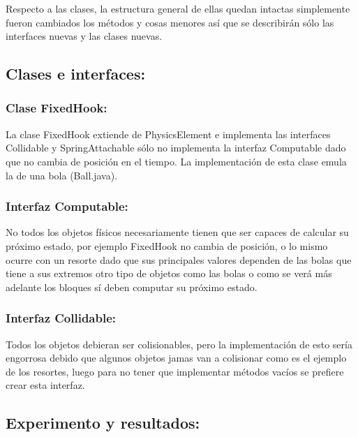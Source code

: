 \documentclass[a4paper,10pt]{article}
\begin{document}
 
 Respecto a las clases, la estructura general de ellas quedan intactas simplemente fueron cambiados los métodos y cosas menores así que se 
 describirán sólo las interfaces nuevas y las clases nuevas.\newline
 
 
\subsection{Clases e interfaces:}
\subsubsection{Clase FixedHook:}


 La clase FixedHook extiende de PhysicsElement e implementa las interfaces Collidable y SpringAttachable sólo no implementa la interfaz Computable
 dado que no cambia de posición en el tiempo. La implementación de esta clase emula la de una bola (Ball.java).\newline
 
 \subsubsection{Interfaz Computable:}
 
 
  No todos los objetos físicos necesariamente tienen que ser capaces de calcular su próximo estado, por ejemplo FixedHook no cambia de posición,
  o lo mismo ocurre con un resorte dado que sus principales valores dependen de las bolas que tiene a sus extremos otro tipo de objetos 
  como las bolas o como se verá más adelante los bloques sí deben computar su próximo estado.\newline
 
 
 \subsubsection{Interfaz Collidable:}
  
  
  Todos los objetos debieran ser colisionables, pero la implementación de esto sería engorrosa debido que algunos objetos jamas van a colisionar
  como es el ejemplo de los resortes, luego para no tener que implementar métodos vacíos se prefiere crear esta interfaz.\newline
  
  \subsection{Experimento y resultados:}
  
\end{document}
